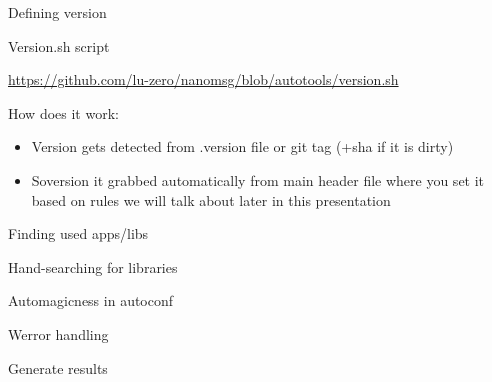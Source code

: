 \documentclass{beamer}
\begin{document}
\begin{frame}[t]{Defining version}
    \begin{small}
    
    \end{small}
\end{frame}

\begin{frame}{Version.sh script}
    \begin{small}
    \url{https://github.com/lu-zero/nanomsg/blob/autotools/version.sh}
    \end{small}
    How does it work:
    \begin{itemize}
    \item Version gets detected from .version file or git tag (+sha if it is dirty)
    \item Soversion it grabbed automatically from main header file where you set it based on rules we will talk about later in this presentation
    \end{itemize}
\end{frame}

\begin{frame}[t]{Finding used apps/libs}
    \begin{small}
    
    \end{small}
\end{frame}

\begin{frame}[t]{Hand-searching for libraries}
    \begin{small}
    
    \end{small}
\end{frame}

\begin{frame}[t]{Automagicness in autoconf}
    \begin{small}
    
    \end{small}
\end{frame}

\begin{frame}[t]{Werror handling}
    \begin{small}
    
    \end{small}
\end{frame}

\begin{frame}[t]{Generate results}
    \begin{small}
    
    \end{small}
\end{frame}
\end{document}
